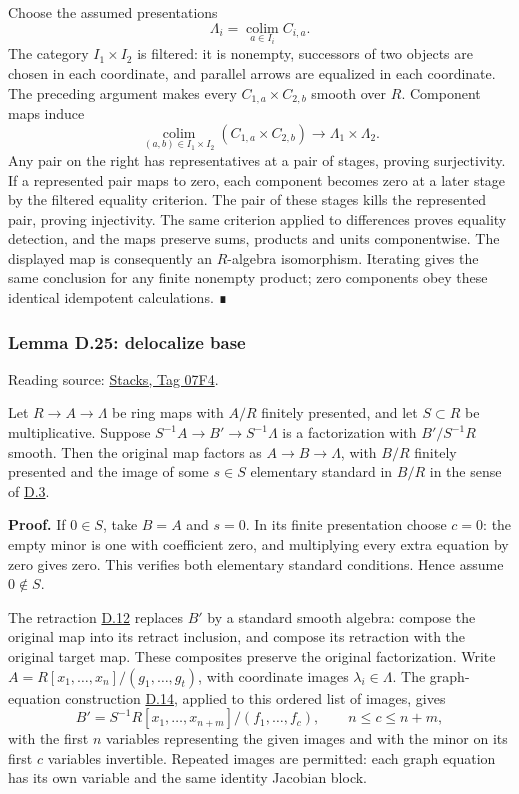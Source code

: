 \documentclass[11pt,a4paper,openany]{report}
\newcounter{none}
\begin{document}
Choose the assumed presentations \[
\Lambda_i=\operatorname*{colim}_{a\in I_i}C_{i,a}.
\] The category \(I_1\times I_2\) is filtered: it is nonempty, successors of two objects are chosen in each coordinate, and parallel arrows are equalized in each coordinate. The preceding argument makes every \(C_{1,a}\times C_{2,b}\) smooth over \(R\). Component maps induce \[
\operatorname*{colim}_{(a,b)\in I_1\times I_2}
(C_{1,a}\times C_{2,b})\longrightarrow\Lambda_1\times\Lambda_2.
\] Any pair on the right has representatives at a pair of stages, proving surjectivity. If a represented pair maps to zero, each component becomes zero at a later stage by the filtered equality criterion. The pair of these stages kills the represented pair, proving injectivity. The same criterion applied to differences proves equality detection, and the maps preserve sums, products and units componentwise. The displayed map is consequently an \(R\)-algebra isomorphism. Iterating gives the same conclusion for any finite nonempty product; zero components obey these identical idempotent calculations. ∎

\label{AG-RG-S05-smoothing-lemma-delocalize-base}

\subsubsection{Lemma D.25: delocalize base}\label{AG-RG-S05-lemma-d.25-delocalize-base}

Reading source: \href{https://stacks.math.columbia.edu/tag/07F4}{Stacks, Tag 07F4}.

Let \(R\to A\to\Lambda\) be ring maps with \(A/R\) finitely presented, and let \(S\subset R\) be multiplicative. Suppose \(S^{-1}A\to B'\to S^{-1}\Lambda\) is a factorization with \(B'/S^{-1}R\) smooth. Then the original map factors as \(A\to B\to\Lambda\), with \(B/R\) finitely presented and the image of some \(s\in S\) elementary standard in \(B/R\) in the sense of \hyperref[AG-RG-S05-smoothing-definition-strictly-standard]{D.3}.

\textbf{Proof.} If \(0\in S\), take \(B=A\) and \(s=0\). In its finite presentation choose \(c=0\): the empty minor is one with coefficient zero, and multiplying every extra equation by zero gives zero. This verifies both elementary standard conditions. Hence assume \(0\notin S\).

The retraction \hyperref[AG-RG-S05-smoothing-lemma-smooth-standard-smooth]{D.12} replaces \(B'\) by a standard smooth algebra: compose the original map into its retract inclusion, and compose its retraction with the original target map. These composites preserve the original factorization. Write \(A=R[x_1,\ldots,x_n]/(g_1,\ldots,g_t)\), with coordinate images \(\lambda_i\in\Lambda\). The graph-equation construction \hyperref[AG-RG-S05-smoothing-lemma-standard-smooth-include-generators]{D.14}, applied to this ordered list of images, gives \[
B'=S^{-1}R[x_1,\ldots,x_{n+m}]/(f_1,\ldots,f_c),
\qquad n\le c\le n+m,
\] with the first \(n\) variables representing the given images and with the minor on its first \(c\) variables invertible. Repeated images are permitted: each graph equation has its own variable and the same identity Jacobian block.
\end{document}
